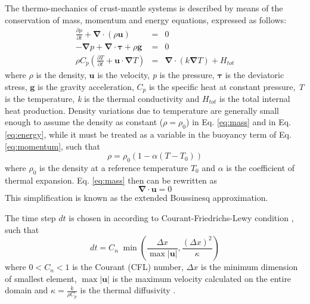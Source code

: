 \documentclass[hidelinks,10pt,a4paper]{article}
\begin{document}
The thermo-mechanics of crust-mantle systems is described by means of the conservation of mass, momentum and energy equations, expressed as follows:
\begin{eqnarray}
\label{eq:mass}\frac{\partial \rho}{\partial t}+\bm{\nabla} \cdot (\rho \bm{u})&=&0\\
\label{eq:momentum}-\bm{\nabla} p + \bm{\nabla} \cdot \bm{\tau} + \rho \bm{g}&=&0\\
\label{eq:energy}\rho C_p \left(\frac{\partial T}{\partial t} + \bm{u} \cdot \bm{\nabla} T \right)&=&\bm{\nabla} \cdot \left(k\bm{\nabla} T\right) + H_{tot}
\end{eqnarray}
where $\rho$ is the density, $\bm{u}$ is the velocity, \textit{p} is the pressure, $\bm{\tau}$ is the deviatoric stress, $\bm{g}$ is the gravity acceleration,
$C_p$ is the specific heat at constant pressure, \textit{T} is the temperature, \textit{k} is the thermal conductivity and $H_{tot}$ is the total internal heat
production. Density variations due to temperature are generally small enough to assume the density as constant ($\rho=\rho_0$) in Eq. \ref{eq:mass} and in
Eq. \ref{eq:energy}, while it must be treated as a variable in the buoyancy term of Eq. \ref{eq:momentum}, such that \[\rho=\rho_0(1-\alpha(T-T_0))\]
where $\rho_0$ is the density at a reference temperature $T_0$ and $\alpha$ is the coefficient of thermal expansion. Eq. \ref{eq:mass} then can be rewritten as
\begin{equation}\label{eq:mass_0}
\bm{\nabla} \cdot \bm{u}=0
\end{equation}
This simplification is known as the extended Boussinesq approximation.

The time step $dt$ is chosen in according to Courant-Friedrichs-Lewy condition \citep{Anderson}, such that
\[dt=C_n\; \min\left(\frac{\Delta x}{\max|\bm{u}|},\frac{(\Delta x)^2}{\kappa}\right)\]
where $0<C_n<1$ is the Courant (CFL) number, $\Delta x$ is the minimum dimension of smallest element, $\max|\bm{u}|$ is the maximum velocity calculated on the
entire domain and
$\kappa=\frac{k}{\rho C_p}$ is the thermal diffusivity \citep{Thieulot2014}.
\end{document}
